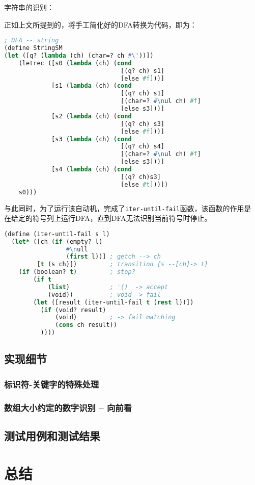 \documentclass[lang=cn]{elegantpaper}
\begin{document}
\begin{example} 字符串的识别：

    正如上文所提到的，将手工简化好的DFA转换为代码，即为：

    \begin{lstlisting}[language=lisp,caption=Racket-lang 实现-用于匹配字符串的DFA定义]
; DFA -- string
(define StringSM
(let ([q? (lambda (ch) (char=? ch #\'))])
    (letrec ([s0 (lambda (ch) (cond
                                [(q? ch) s1]
                                [else #f]))]
             [s1 (lambda (ch) (cond
                                [(q? ch) s1]
                                [(char=? #\nul ch) #f]
                                [else s3]))]
             [s2 (lambda (ch) (cond
                                [(q? ch) s3]
                                [else #f]))]
             [s3 (lambda (ch) (cond
                                [(q? ch) s4]
                                [(char=? #\nul ch) #f]
                                [else s3]))]
             [s4 (lambda (ch) (cond
                                [(q? ch)s3]
                                [else #t]))])
    s0)))
    \end{lstlisting}

    与此同时，为了运行该自动机，完成了\lstinline|iter-until-fail|函数，该函数的作用是
    在给定的符号列上运行DFA，直到DFA无法识别当前符号时停止。

    \begin{lstlisting}[language=lisp, caption=在给定的符号列上，运行该状态机]
(define (iter-until-fail s l)
  (let* ([ch (if (empty? l)
                 #\null
                 (first l))] ; getch --> ch
         [t (s ch)])         ; transition {s --[ch]-> t}
    (if (boolean? t)         ; stop?
        (if t
            (list)           ; '()  -> accept
            (void))          ; void -> fail
        (let ([result (iter-until-fail t (rest l))])
          (if (void? result)
              (void)         ; -> fail matching
              (cons ch result))
          ))))
    \end{lstlisting}
\end{example}

\subsection{实现细节}

\subsubsection{标识符-关键字的特殊处理}

\subsubsection{数组大小约定的数字识别 -- 向前看}

\subsection{测试用例和测试结果}

\section{总结}
\end{document}
